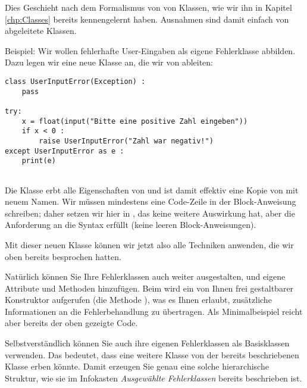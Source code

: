 Dies Geschieht nach dem Formalismus von von Klassen, wie wir ihn in Kapitel \ref{chp:Classes} bereits kennengelernt haben. Ausnahmen sind damit einfach von  abgeleitete Klassen.

Beispiel: Wir wollen fehlerhafte User-Eingaben als eigene Fehlerklasse abbilden. Dazu legen wir eine neue Klasse  an, die wir von  ableiten:

\begin{codebox}
\begin{verbatim}
class UserInputError(Exception) :
    pass

try:
    x = float(input("Bitte eine positive Zahl eingeben"))
    if x < 0 :
        raise UserInputError("Zahl war negativ!")
except UserInputError as e :
    print(e)
    
\end{verbatim}
\end{codebox}

Die Klasse  erbt alle Eigenschaften von  und ist damit effektiv eine Kopie von  mit neuem Namen. Wir müssen mindestens eine Code-Zeile in der Block-Anweisung  schreiben; daher setzen wir hier in , das keine weitere Auswirkung hat, aber die Anforderung an die Syntax erfüllt (keine leeren Block-Anweisungen).

Mit dieser neuen Klasse können wir jetzt also alle Techniken anwenden, die wir oben bereits besprochen hatten.

Natürlich können Sie Ihre Fehlerklassen auch weiter ausgestalten, und eigene Attribute und Methoden hinzufügen. Beim  wird ein von Ihnen frei gestaltbarer Konstruktor aufgerufen (\ie die Methode ), was es Ihnen erlaubt, zusätzliche Informationen an die Fehlerbehandlung zu übertragen. Als Minimalbeispiel reicht aber bereits der oben gezeigte Code.

Selbstverständlich können Sie auch ihre eigenen Fehlerklassen als Basisklassen verwenden. Das bedeutet, dass eine weitere Klasse  von der bereits beschriebenen Klasse  erben könnte. Damit erzeugen Sie genau eine solche hierarchische Struktur, wie sie im Infokasten \emph{Ausgewählte Fehlerklassen} bereits beschrieben ist.